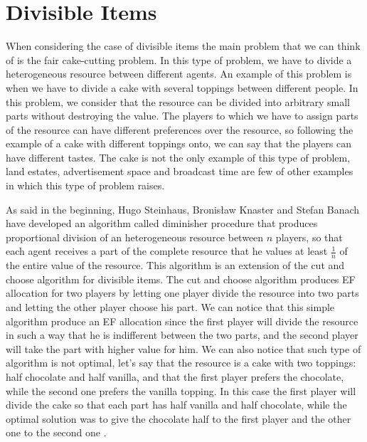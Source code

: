 \section{Divisible Items}
When considering the case of divisible items the main problem that we can think of is the fair cake-cutting problem. In this type of problem, we have to divide a heterogeneous resource between different agents. An example of this problem is when we have to divide a cake with several toppings between different people. In this problem, we consider that the resource can be divided into arbitrary small parts without destroying the value. The players to which we have to assign parts of the resource can have different preferences over the resource, so following the example of a cake with different toppings onto, we can say that the players can have different tastes. The cake is not the only example of this type of problem, land estates, advertisement space and broadcast time are few of other examples in which this type of problem raises. 

As said in the beginning, Hugo Steinhaus, Bronisław Knaster and Stefan Banach have developed an algorithm called diminisher procedure that produces proportional division of an heterogeneous resource between $n$ players, so that each agent receives a part of the complete resource that he values at least $\frac{1}{n}$ of the entire value of the resource. This algorithm is an extension of the cut and choose algorithm for divisible items. The cut and choose algorithm produces EF allocation for two players by letting one player divide the resource into two parts and letting the other player choose his part. We can notice that this simple algorithm produce an EF allocation since the first player will divide the resource in such a way that he is indifferent between the two parts, and the second player will take the part with higher value for him. We can also notice that such type of algorithm is not optimal, let's say that the resource is a cake with two toppings: half chocolate and half vanilla, and that the first player prefers the chocolate, while the second one prefers the vanilla topping. In this case the first player will divide the cake so that each part has half vanilla and half chocolate, while the optimal solution was to give the chocolate half to the first player and the other one to the second one \cite{wiki-fair-division}.   

